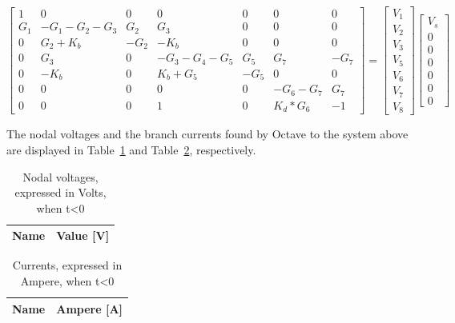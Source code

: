 $$
\begin{bmatrix}
  1 & 0 & 0 & 0 & 0 & 0 & 0 \\
  G_{1} & -G_{1}-G_{2}-G_{3} & G_{2} & G_{3} & 0 & 0 & 0 \\
  0 & G_{2}+K_{b} & -G_{2} & -K_{b} & 0 & 0 & 0 \\
  0 & G_{3} & 0 & -G_{3}-G_{4}-G_{5} & G_{5} & G_{7} & -G_{7} \\
  0 & -K_{b} & 0 & K_{b}+G_{5} & -G_{5} & 0 & 0 \\
  0 & 0 & 0 & 0 & 0 & -G_{6}-G_{7} & G_{7} \\
  0 & 0 & 0 & 1 & 0 & K_{d}*G_{6} & -1
\end{bmatrix}
=
\begin{bmatrix}
  V_{1}\\
  V_{2}\\
  V_{3}\\
  V_{5}\\
  V_{6}\\
  V_{7}\\
  V_{8}
\end{bmatrix}
\begin{bmatrix}
  V_{s}\\
  0\\
  0\\
  0\\
  0\\
  0\\
  0
\end{bmatrix}
$$

The nodal voltages and the branch currents found by Octave to the system above
are displayed in Table~\ref{tab:volt1} and Table~\ref{tab:curr1}, respectively.\par

\begin{minipage}
\centering
\begin{table} [b]
  \begin{tabular}{|l|r|}
    \hline    
    {\bf Name} & {\bf Value [V]} \\ \hline
    
  \end{tabular}
  \caption{Nodal voltages, expressed in Volts, when t<0}
  \label{tab:volt1}
\end{table}
\end{minipage}
\begin{minipage}
\begin{table} [b]
  \begin{tabular}{|l|r|}
    \hline    
    {\bf Name} & {\bf Ampere [A]} \\ \hline
    
  \end{tabular}
  \caption{Currents, expressed in Ampere, when t<0}
  \label{tab:curr1}
\end{table}
\end{minipage}

